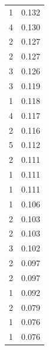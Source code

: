 \begin{tabular}{rr}
1 & 0.132 \\
4 & 0.130 \\
2 & 0.127 \\
2 & 0.127 \\
3 & 0.126 \\
3 & 0.119 \\
1 & 0.118 \\
4 & 0.117 \\
2 & 0.116 \\
5 & 0.112 \\
2 & 0.111 \\
1 & 0.111 \\
1 & 0.111 \\
1 & 0.106 \\
2 & 0.103 \\
2 & 0.103 \\
3 & 0.102 \\
2 & 0.097 \\
2 & 0.097 \\
1 & 0.092 \\
2 & 0.079 \\
1 & 0.076 \\
1 & 0.076 \\
\bottomrule
\end{tabular}
